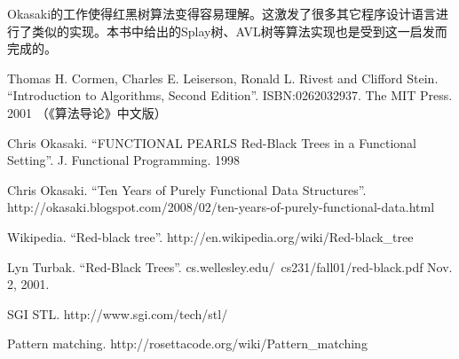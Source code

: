 \documentclass[UTF8]{article}
\begin{document}
Okasaki的工作使得红黑树算法变得容易理解。这激发了很多其它程序设计语言进行了类似的实现\cite{rosetta}。本书中给出的Splay树、AVL树等算法实现也是受到这一启发而完成的。

\begin{thebibliography}{99}

Thomas H. Cormen, Charles E. Leiserson, Ronald L. Rivest and Clifford Stein.
``Introduction to Algorithms, Second Edition''. ISBN:0262032937. The MIT Press. 2001 （《算法导论》中文版）

Chris Okasaki. ``FUNCTIONAL PEARLS Red-Black Trees in a Functional Setting''. J. Functional Programming. 1998

Chris Okasaki. ``Ten Years of Purely Functional Data Structures''. http://okasaki.blogspot.com/2008/02/ten-years-of-purely-functional-data.html

Wikipedia. ``Red-black tree''. http://en.wikipedia.org/wiki/Red-black\_tree

Lyn Turbak. ``Red-Black Trees''. cs.wellesley.edu/~cs231/fall01/red-black.pdf Nov. 2, 2001.

SGI STL. http://www.sgi.com/tech/stl/

Pattern matching. http://rosettacode.org/wiki/Pattern\_matching

\end{thebibliography}

\ifx\wholebook\relax\else
\end{document}
